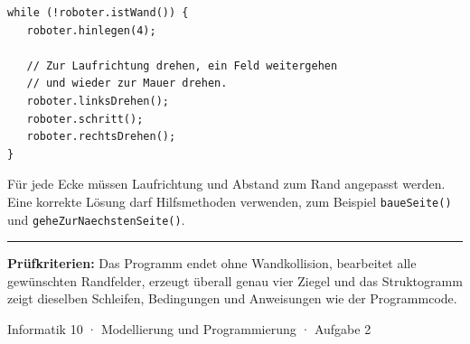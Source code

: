 \documentclass[10pt,a4paper]{article}
\newcommand{\tasktitle}[1]{%
  \vspace{2pt}{\large\bfseries\color{Blue}#1}\par
  \color{Line}\hrule\color{black}\vspace{2pt}
}
\begin{document}
\begin{lstlisting}
while (!roboter.istWand()) {
   roboter.hinlegen(4);

   // Zur Laufrichtung drehen, ein Feld weitergehen
   // und wieder zur Mauer drehen.
   roboter.linksDrehen();
   roboter.schritt();
   roboter.rechtsDrehen();
}
\end{lstlisting}

Für jede Ecke müssen Laufrichtung und Abstand zum Rand angepasst werden.
Eine korrekte Lösung darf Hilfsmethoden verwenden, zum Beispiel
\texttt{baueSeite()} und \texttt{geheZurNaechstenSeite()}.

\tasktitle{d) Struktogramm zu c)}

\begin{center}
\end{center}

\vspace{3pt}
\colorbox{Mint}{%
  \parbox{\dimexpr\textwidth-2\fboxsep\relax}{%
    \textbf{\color{Navy}Prüfkriterien:}
    Das Programm endet ohne Wandkollision, bearbeitet alle gewünschten
    Randfelder, erzeugt überall genau vier Ziegel und das Struktogramm zeigt
    dieselben Schleifen, Bedingungen und Anweisungen wie der Programmcode.
  }%
}

\vspace{3pt}
{\small\color{Muted}
Informatik 10 · Modellierung und Programmierung · Aufgabe 2}
\end{document}
